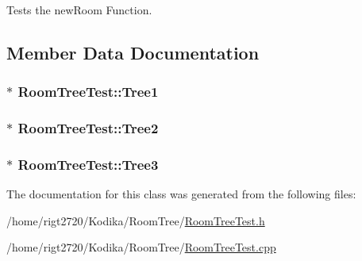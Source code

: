 Tests the new\-Room Function. 



\subsection{Member Data Documentation}
\hypertarget{classRoomTreeTest_aba5c37d20a82bff695de4c78a547f23f}{
\subsubsection[{Tree1}]{$\ast$ Room\-Tree\-Test\-::\-Tree1\hspace{0.3cm}{\ttfamily [private]}}}\label{classRoomTreeTest_aba5c37d20a82bff695de4c78a547f23f}
\hypertarget{classRoomTreeTest_aada805154b8f5306805936f0ba43834c}{
\subsubsection[{Tree2}]{$\ast$ Room\-Tree\-Test\-::\-Tree2\hspace{0.3cm}{\ttfamily [private]}}}\label{classRoomTreeTest_aada805154b8f5306805936f0ba43834c}
\hypertarget{classRoomTreeTest_aa70878ec1fa44e95f78e59a236572b27}{
\subsubsection[{Tree3}]{$\ast$ Room\-Tree\-Test\-::\-Tree3\hspace{0.3cm}{\ttfamily [private]}}}\label{classRoomTreeTest_aa70878ec1fa44e95f78e59a236572b27}


The documentation for this class was generated from the following files\-:\begin{DoxyCompactItemize}
\item 
/home/rigt2720/\-Kodika/\-Room\-Tree/\hyperlink{RoomTreeTest_8h}{Room\-Tree\-Test.\-h}\item 
/home/rigt2720/\-Kodika/\-Room\-Tree/\hyperlink{RoomTreeTest_8cpp}{Room\-Tree\-Test.\-cpp}\end{DoxyCompactItemize}
